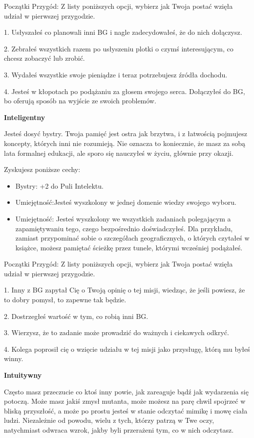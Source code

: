 Początki Przygód: Z listy poniższych opcji, wybierz jak Twoja postać wzięła udział w pierwszej przygodzie.

1. Usłyszałeś co planowali inni BG i nagle zadecydowałeś, że do nich dołączysz.

2. Zebrałeś wszystkich razem po usłyszeniu plotki o czymś interesującym, co chcesz zobaczyć lub zrobić.

3. Wydałeś wszystkie swoje pieniądze i teraz potrzebujesz źródła dochodu.

4. Jesteś w kłopotach po podążaniu za głosem swojego serca. Dołączyłeś do BG, bo oferują sposób na wyjście ze swoich problemów.

\textbf{Inteligentny}

Jesteś dosyć bystry. Twoja pamięć jest ostra jak brzytwa, i z łatwością pojmujesz koncepty, których inni nie rozumieją. Nie oznacza to koniecznie, że masz za sobą lata formalnej edukacji, ale sporo się nauczyłeś w życiu, głównie przy okazji.

Zyskujesz poniższe cechy:
\begin{itemize}
\item Bystry: +2 do Puli Intelektu.
\item Umiejętność:Jesteś wyszkolony w jednej domenie wiedzy swojego wyboru.
\item Umiejętność: Jesteś wyszkolony we wszystkich zadaniach polegającym a zapamiętywaniu tego, czego bezpośrednio doświadczyłeś. Dla przykładu, zamiast przypominać sobie o szczegółach geograficznych, o których czytałeś w książce, możesz pamiętać ścieżkę przez tunele, którymi wcześniej podążałeś.
\end{itemize}

Początki Przygód: Z listy poniższych opcji, wybierz jak Twoja postać wzięła udział w pierwszej przygodzie.

1. Inny z BG zapytał Cię o Twoją opinię o tej misji, wiedząc, że jeśli powiesz, że to dobry pomysł, to zapewne tak będzie.

2. Dostrzegłeś wartość w tym, co robią inni BG.

3. Wierzysz, że to zadanie może prowadzić do ważnych i ciekawych odkryć.

4. Kolega poprosił cię o wzięcie udziału w tej misji jako przysługę, którą mu byłeś winny.

\textbf{Intuitywny}

Często masz przeczucie co ktoś inny powie, jak zareaguje bądź jak wydarzenia się potoczą. Może masz jakiś zmysł mutanta, może możesz na parę chwil spojrzeć w bliską przyszłość, a może po prostu jesteś w stanie odczytać mimikę i mowę ciała ludzi. Niezależnie od powodu, wielu z tych, którzy patrzą w Twe oczy, natychmiast odwraca wzrok, jakby byli przerażeni tym, co w nich odczytasz.

